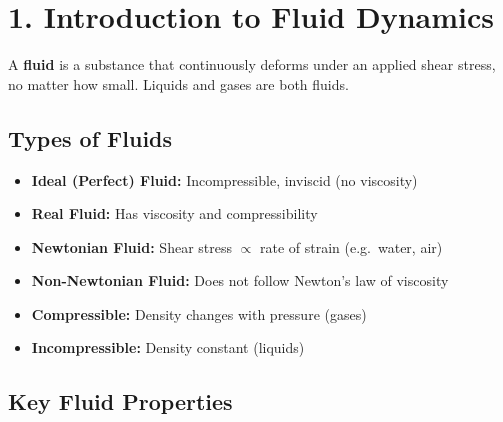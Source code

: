 \documentclass[12pt]{article}
\begin{document}
\vspace{16pt}

\begin{tcolorbox}[
  enhanced, arc=4pt, boxrule=1.5pt,
  colback=white, colframe=primary,
  left=10pt, right=10pt, top=4pt, bottom=8pt,
  title={\bfseries\color{white} Table of Contents},
  colbacktitle=primary,
  attach boxed title to top left={xshift=10pt, yshift=-\tcboxedtitleheight/2},
  boxed title style={arc=3pt, colframe=primary, boxrule=0pt},
]
\vspace{4pt}
\tableofcontents
\end{tcolorbox}

\newpage

\section{1. Introduction to Fluid Dynamics}

\begin{defbox}[Fluid]
A \textbf{fluid} is a substance that continuously deforms under an applied shear stress, no matter how small. Liquids and gases are both fluids.
\end{defbox}

\subsection{Types of Fluids}
\begin{itemize}[leftmargin=16pt, itemsep=3pt]
  \item \textbf{Ideal (Perfect) Fluid:} Incompressible, inviscid (no viscosity)
  \item \textbf{Real Fluid:} Has viscosity and compressibility
  \item \textbf{Newtonian Fluid:} Shear stress $\propto$ rate of strain (e.g.\ water, air)
  \item \textbf{Non-Newtonian Fluid:} Does not follow Newton's law of viscosity
  \item \textbf{Compressible:} Density changes with pressure (gases)
  \item \textbf{Incompressible:} Density constant (liquids)
\end{itemize}

\subsection{Key Fluid Properties}
\end{document}
